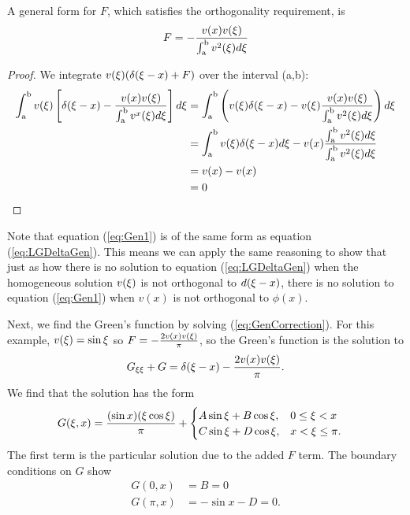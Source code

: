     \begin{theorem}
        A general form for \(F\), which satisfies the orthogonality requirement, is
    \begin{equation*}
        F=-\frac{v(x)v(\xi)}{\int_{\mathrm{a}}^{\mathrm{b}}v^2(\xi)d\xi}
    \end{equation*}
    \end{theorem}
    \begin{proof}
        We integrate \(v(\xi)(\delta(\xi-x)+F)\) over the interval (a,b):
        \begin{equation*}
            \begin{split}
                \int_\mathrm{a}^\mathrm{b} v(\xi)\left[\delta(\xi-x) - \frac{v(x)v(\xi)}{\int_{\mathrm{a}}^{\mathrm{b}}v^x(\xi)d\xi} \right]d\xi &= \int_\mathrm{a}^\mathrm{b} \left(v(\xi)\delta(\xi-x) - v(\xi)\frac{v(x)v(\xi)}{\int_{\mathrm{a}}^{\mathrm{b}}v^2(\xi)d\xi} \right)d\xi \\
                &=\int_\mathrm{a}^\mathrm{b} v(\xi)\delta(\xi-x)d\xi - v(x)\frac{\int_{\mathrm{a}}^{\mathrm{b}}v^2(\xi)d\xi}{\int_{\mathrm{a}}^{\mathrm{b}}v^2(\xi)d\xi}\\
                &= v(x)-v(x)\\
                &=0
            \end{split}
        \end{equation*}
    \end{proof}

    Note that equation (\ref{eq:Gen1}) is of the same form as equation (\ref{eq:LGDeltaGen}). This means we can apply the same reasoning to show that just as how there is no solution to equation (\ref{eq:LGDeltaGen}) when the homogeneous solution \(v(\xi)\) is not orthogonal to \(d(\xi-x)\), there is no solution to equation (\ref{eq:Gen1}) when \(v(x)\) is not orthogonal to \(\phi(x)\). 

    Next, we find the Green's function by solving (\ref{eq:GenCorrection}). For this example, \(v(\xi)= \sin \xi\) so \(F=-\frac{2 v(x)v(\xi)}{\pi}\), so the Green's function is the solution to
    \begin{equation*}
        G_{\xi\xi} + G = \delta(\xi-x) - \frac{2 v(x)v(\xi)}{\pi}.
    \end{equation*}
    We find that the solution has the form
    \begin{equation*}
        \begin{split}
            G(\xi, x) &= \frac{(\sin x)(\xi\cos \xi)}{\pi} + \begin{cases}
                A\sin\xi + B\cos\xi, & 0\leq\xi < x\\
                C\sin\xi + D\cos\xi, & x < \xi \leq \pi. 
            \end{cases}
        \end{split}
    \end{equation*}
    The first term is the particular solution due to the added \(F\) term. The boundary conditions on \(G\) show 
    \begin{equation}\label{eq:genBoundarySln}
        \begin{split}
            G(0,x) &= B = 0\\
            G(\pi,x) &= -\sin x - D = 0.
        \end{split}
    \end{equation}


